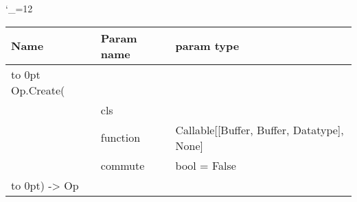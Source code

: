 \begingroup \catcode`\_=12 \tt
\begin{tabular}{lll}
\toprule
\textrm{Name}&\textrm{Param name}&\textrm{param type}\\
\midrule
\hbox to 0pt {Op.Create(\hss}\\
& cls\\
& function & Callable[[Buffer, Buffer, Datatype], None]\\
& commute & bool = False\\
\hbox to 0pt{) -> Op\hss}\\
\bottomrule
\end{tabular}
\endgroup
